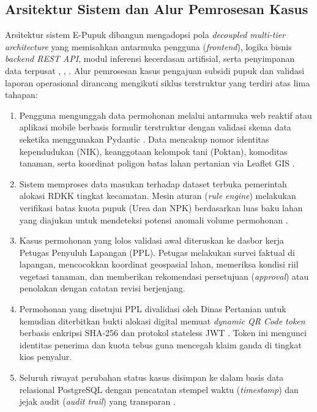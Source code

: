 \documentclass[conference]{IEEEtran}
\begin{document}
\subsection{Arsitektur Sistem dan Alur Pemrosesan Kasus}
Arsitektur sistem E-Pupuk dibangun mengadopsi pola \textit{decoupled multi-tier architecture} yang memisahkan antarmuka pengguna (\textit{frontend}), logika bisnis \textit{backend REST API}, modul inferensi kecerdasan artifisial, serta penyimpanan data terpusat \cite{b1}, \cite{b14}, \cite{b15}. Alur pemrosesan kasus pengajuan subsidi pupuk dan validasi laporan operasional dirancang mengikuti siklus terstruktur yang terdiri atas lima tahapan:
\begin{enumerate}
    \item Pengguna mengunggah data permohonan melalui antarmuka web reaktif \cite{b14} atau aplikasi mobile berbasis formulir terstruktur dengan validasi skema data seketika menggunakan Pydantic \cite{b18}. Data mencakup nomor identitas kependudukan (NIK), keanggotaan kelompok tani (Poktan), komoditas tanaman, serta koordinat poligon batas lahan pertanian via Leaflet GIS \cite{b16}.
    \item Sistem memproses data masukan terhadap dataset terbuka pemerintah alokasi RDKK tingkat kecamatan. Mesin aturan (\textit{rule engine}) melakukan verifikasi batas kuota pupuk (Urea dan NPK) berdasarkan luas baku lahan yang diajukan untuk mendeteksi potensi anomali volume permohonan \cite{b17}.
    \item Kasus permohonan yang lolos validasi awal diteruskan ke dasbor kerja Petugas Penyuluh Lapangan (PPL). Petugas melakukan survei faktual di lapangan, mencocokkan koordinat geospasial lahan, memeriksa kondisi riil vegetasi tanaman, dan memberikan rekomendasi persetujuan (\textit{approval}) atau penolakan dengan catatan revisi berjenjang.
    \item Permohonan yang disetujui PPL divalidasi oleh Dinas Pertanian untuk kemudian diterbitkan bukti alokasi digital memuat \textit{dynamic QR Code token} berbasis enkripsi SHA-256 dan protokol stateless JWT \cite{b2}. Token ini mengunci identitas penerima dan kuota tebus guna mencegah klaim ganda di tingkat kios penyalur.
    \item Seluruh riwayat perubahan status kasus disimpan ke dalam basis data relasional PostgreSQL dengan pencatatan stempel waktu (\textit{timestamp}) dan jejak audit (\textit{audit trail}) yang transparan \cite{b13}.
\end{enumerate}
\end{document}
